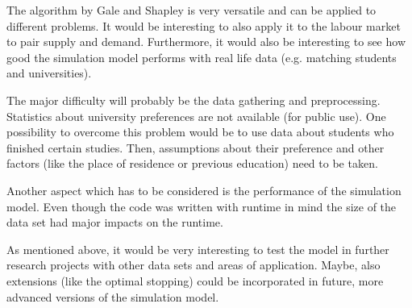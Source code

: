 \label{summary}
The algorithm by Gale and Shapley is very versatile and can be applied to different problems.
It would be interesting to also apply it to the labour market to pair supply and demand. 
Furthermore, it would also be interesting to see how good the simulation model performs with real life data (e.g. matching students and universities).

The major difficulty will probably be the data gathering and preprocessing. 
Statistics about university preferences are not available (for public use).
One possibility to overcome this problem would be to use data about students who finished certain studies.
Then, assumptions about their preference and other factors (like the place of residence or previous education) need to be taken.

Another aspect which has to be considered is the performance of the simulation model.
Even though the code was written with runtime in mind the size of the data set had major impacts on the runtime.

As mentioned above, it would be very interesting to test the model in further research projects with other data sets and areas of application.
Maybe, also extensions (like the optimal stopping) could be incorporated in future, more advanced versions of the simulation model.
